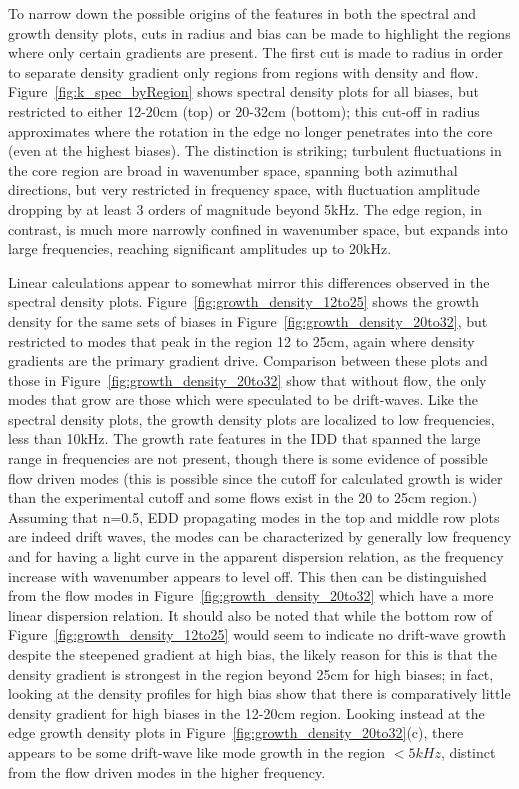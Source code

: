\documentclass[aip,pop,amsmath,amssymb,reprint,superscriptaddress]{revtex4-1} %
\begin{document}
To narrow down the possible origins of the features in both the spectral and growth density plots, cuts in radius and bias can be made to highlight the regions where only certain gradients are present. The first cut is made to radius in order to separate density gradient only regions from regions with density and flow. Figure~\ref{fig:k_spec_byRegion} shows spectral density plots for all biases, but restricted to either 12-20cm (top) or 20-32cm (bottom); this cut-off in radius approximates where the rotation in the edge no longer penetrates into the core (even at the highest biases). The distinction is striking; turbulent fluctuations in the core region are broad in wavenumber space, spanning both azimuthal directions, but very restricted in frequency space, with fluctuation amplitude dropping by at least 3 orders of magnitude beyond 5kHz. The edge region, in contrast, is much more narrowly confined in wavenumber space, but expands into large frequencies, reaching significant amplitudes up to 20kHz.

Linear calculations appear to somewhat mirror this differences observed in the spectral density plots. Figure~\ref{fig:growth_density_12to25} shows the growth density for the same sets of biases in Figure~\ref{fig:growth_density_20to32}, but restricted to modes that peak in the region 12 to 25cm, again where density gradients are the primary gradient drive. Comparison between these plots and those in Figure~\ref{fig:growth_density_20to32} show that without flow, the only modes that grow are those which were speculated to be drift-waves. Like the spectral density plots, the growth density plots are localized to low frequencies, less than 10kHz. The growth rate features in the IDD that spanned the large range in frequencies are not present, though there is some evidence of possible flow driven modes (this is possible since the cutoff for calculated growth is wider than the experimental cutoff and some flows exist in the 20 to 25cm region.) Assuming that n=0.5, EDD propagating modes in the top and middle row plots are indeed drift waves, the modes can be characterized by generally low frequency and for having a light curve in the apparent dispersion relation, as the frequency increase with wavenumber appears to level off. This then can be distinguished from the flow modes in Figure~\ref{fig:growth_density_20to32} which have a more linear dispersion relation. It should also be noted that while the bottom row of Figure~\ref{fig:growth_density_12to25} would seem to indicate no drift-wave growth despite the steepened gradient at high bias, the likely reason for this is that the density gradient is strongest in the region beyond 25cm for high biases; in fact, looking at the density profiles for high bias show that there is comparatively little density gradient for high biases in the 12-20cm region. Looking instead at the edge growth density plots in Figure~\ref{fig:growth_density_20to32}(c), there appears to be some drift-wave like mode growth in the region $<5kHz$, distinct from the flow driven modes in the higher frequency.
\end{document}
